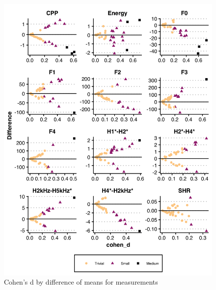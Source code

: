 \begin{figure}[htbp]
    \begin{center}
    \includegraphics[width=\linewidth]{figures/ch3_cohend_part1_5in.png} 
    \caption{Cohen's d by difference of means for measurements}
    \label{ch3:fig:cohendmeasure}
    \end{center}
\end{figure}

